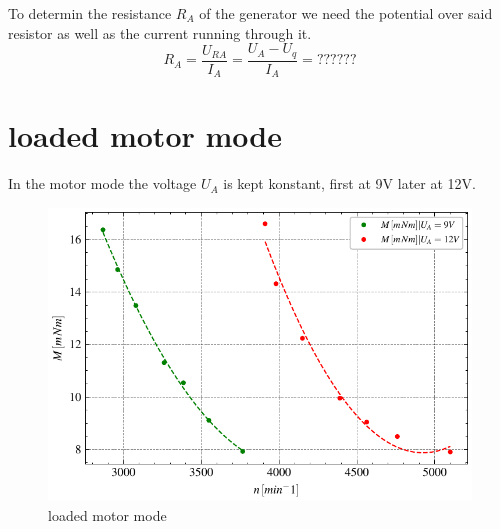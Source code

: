 \documentclass[conference]{IEEEtran}
\begin{document}
To determin the resistance $R_A$ of the generator we need the potential over said resistor as well as the current running through it.\\

\begin{equation}
    R_A = \frac{U_{RA}}{I_A} = \frac{U_A - U_q}{I_A} = ??????
\end{equation}


\section{loaded motor mode}
In the motor mode the voltage $U_A$ is kept konstant, first at 9V later at 12V.






\begin{figure}[htbp]
    \centering
    \includegraphics[width=\columnwidth]{plots/4.3_Belasteter_Motor_UA9V_12V.pdf}
    \caption{loaded motor mode}
    \label{fig:Anlaufmoment}
\end{figure}
\end{document}
